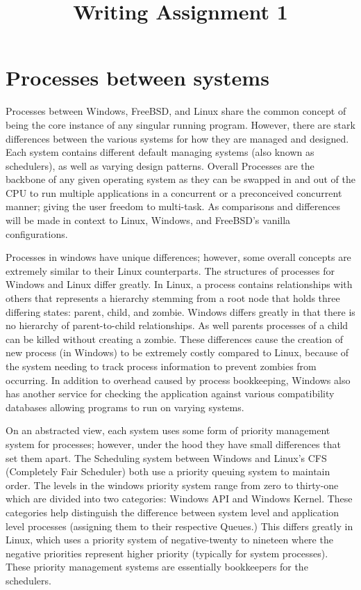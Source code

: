 \documentclass[letterpaper,10pt,titlepage]{IEEEtran}
\author{\name}
\title{Writing Assignment 1}
\begin{document}
\maketitle
\hrulefill

\section{Processes between systems}
Processes between Windows, FreeBSD, and Linux share the common concept of being the core instance of any singular running program. However, there are stark differences between the various systems for how they are managed and designed. Each system contains different default managing systems (also known as schedulers), as well as varying design patterns. Overall Processes are the backbone of any given operating system as they can be swapped in and out of the CPU to run multiple applications in a concurrent or a preconceived concurrent manner; giving the user freedom to multi-task. As comparisons and differences will be made in context to Linux, Windows, and FreeBSD's vanilla configurations.

Processes in windows have unique differences; however, some  overall concepts are extremely similar to their Linux counterparts. The structures of processes for Windows and Linux differ greatly. In Linux, a process contains relationships with others that represents a hierarchy stemming from a root node that holds three differing states: parent, child, and zombie\cite{wwwtldpo42:online}. Windows differs greatly in that there is no hierarchy of parent-to-child relationships. As well parents processes of a child can be killed without creating a zombie\cite{CS3013Op9:online}. These differences cause the creation of new process (in Windows) to be extremely costly compared to Linux, because of the system needing to track process information to prevent zombies from occurring. In addition to overhead caused by process bookkeeping, Windows also has another service for checking the application against various compatibility databases allowing programs to run on varying systems\cite{AboutPro74:online}.

On an abstracted view, each system uses some form of priority management system for processes; however, under the hood they have small differences that set them apart. The Scheduling system between Windows and Linux's CFS (Completely Fair Scheduler) both use a priority queuing system to maintain order. The levels in the windows priority system range from zero to thirty-one which are divided into two categories: Windows API and Windows Kernel\cite{windowsbookpt1}. These categories help distinguish the difference between system level and application level processes (assigning them to their respective Queues.) This differs greatly in Linux, which uses a priority system of negative-twenty to nineteen \cite{love_2015} where the negative priorities represent higher priority (typically for system processes). These priority management systems are essentially bookkeepers for the schedulers.
\end{document}
